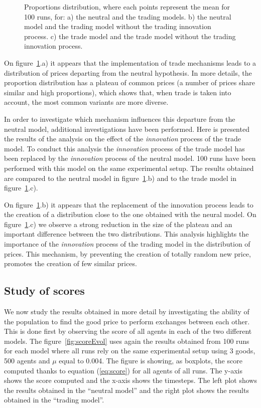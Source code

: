 \documentclass{wscpaperproc}
\begin{document}
\begin{figure}[!h]
\begin{center}
	\end{center}
	\caption{Proportions distribution, where each points represent the mean for 100 runs, for: a) the neutral and the trading models.  b) the neutral model and the trading model without the trading innovation process. c) the trade model and the trade model without the trading innovation process.}
	\label{fig:2setDi}
\end{figure}

On figure~\ref{fig:2setDi}.a) it appears that the implementation of trade mechanisms leads to a distribution of prices departing from the neutral hypothesis. In more details, the proportion distribution has a plateau of common prices (a number of prices share similar and high proportions), which shows that, when trade is taken into account, the most common variants are more diverse. 

In order to investigate which mechanism influences this departure from the neutral model, additional investigations have been performed. Here is presented the results of the analysis on the effect of the \emph{innovation} process of the trade model. To conduct this analysis the \emph{innovation} process of the trade model has been replaced by the \emph{innovation} process of the neutral model. 100 runs have been performed with this model on the same experimental setup. The results obtained are compared to the neutral model in figure~\ref{fig:2setDi}.b) and to the trade model in figure~\ref{fig:2setDi}.c). 

On figure~\ref{fig:2setDi}.b) it appears that the replacement of the innovation process leads to the creation of a distribution close to the one obtained with the neural model. On figure~\ref{fig:2setDi}.c) we observe a strong reduction in the size of the plateau and an important difference between the two distributions. This analysis highlights the importance of the \emph{innovation} process of the trading model in the distribution of prices. This mechanism, by preventing the creation of totally random new price, promotes the creation of few similar prices.


\subsection{Study of scores}

We now study the results obtained in more detail by investigating the ability of the population to find the good price to perform exchanges between each other. This is done first by observing the score of all agents in each of the two different models. The figure~\ref{fig:scoreEvol} uses again the results obtained from 100 runs for each model where all runs rely on the same experimental setup using 3 goods, 500 agents and $\mu$ equal to 0.004. The figure is showing, as boxplots, the score computed thanks to equation (\ref{eq:score}) for all agents of all runs. The y-axis shows the score computed and the x-axis shows the timesteps. The left plot shows the results obtained in the ``neutral model'' and the right plot shows the results obtained in the ``trading model''.
\end{document}

